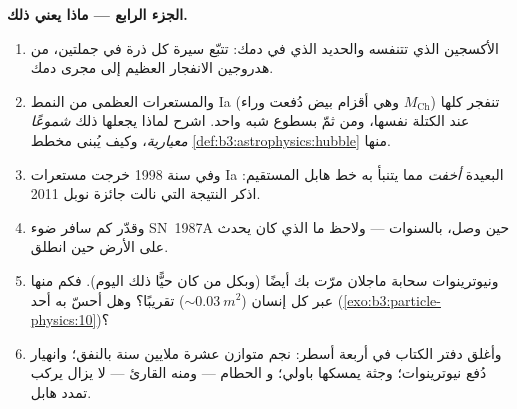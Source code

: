 \begin{problem}
\medskip\noindent\textbf{الجزء الرابع --- ماذا يعني ذلك.}

\begin{enumerate}[resume]
  \item الأكسجين الذي تتنفسه والحديد الذي في دمك:
        تتبّع سيرة كل ذرة في جملتين، من
        هدروجين الانفجار العظيم إلى مجرى دمك.
  \item والمستعرات العظمى من النمط Ia (وهي أقزام بيض دُفعت وراء
        $M_{\text{Ch}}$) تنفجر كلها عند الكتلة نفسها، ومن ثمّ
        بسطوع شبه واحد. اشرح لماذا يجعلها ذلك
        \emph{شموعًا معيارية}، وكيف يُبنى مخطط
        \cref{def:b3:astrophysics:hubble}
        منها.
  \item وفي سنة 1998 خرجت مستعرات Ia البعيدة \emph{أخفت}
        مما يتنبأ به خط هابل المستقيم: اذكر
        النتيجة التي نالت جائزة نوبل 2011.
  \item وقدّر كم سافر ضوء SN~1987A حين
        وصل، بالسنوات --- ولاحظ ما الذي كان يحدث على
        الأرض حين انطلق.
  \item ونيوترينوات سحابة ماجلان مرّت بك أيضًا (وبكل من كان
        حيًّا ذلك اليوم). فكم منها عبر كل إنسان
        (${\sim}\qty{0.03}{m^2}$) تقريبًا؟ وهل أحسّ به أحد
        (\cref{exo:b3:particle-physics:10})؟
  \item وأغلق دفتر الكتاب في أربعة أسطر: نجم متوازن
        عشرة ملايين سنة بالنفق؛ وانهيار دُفع
        نيوترينوات؛ وجثة يمسكها باولي؛ و
        الحطام --- ومنه القارئ --- لا يزال يركب
        تمدد هابل.
\end{enumerate}
\end{problem}
